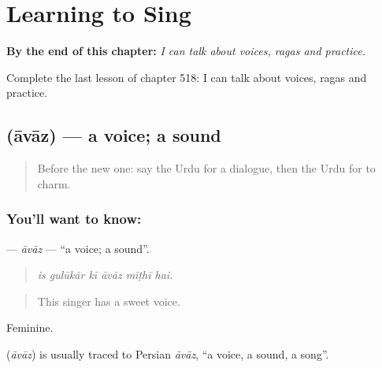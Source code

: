 
\chapter{Learning to Sing}
\label{ch:ur-learning-to-sing}

\begin{chapteropening}
\textbf{By the end of this chapter:} \emph{I can talk about voices, ragas and practice.}

Complete the last lesson of chapter 518: I can talk about voices, ragas and practice.
\end{chapteropening}

\section[\texorpdfstring{\ur{آواز} (āvāz)}{آواز (āvāz)}]{ (āvāz) — a voice; a sound}

\label{lesson:UR-C518-avaz}



\begin{quote}
Before the new one: say the Urdu for a dialogue, then the Urdu for to charm.
\end{quote}

\subsection*{You'll want to know: }
\textbf{} — \emph{āvāz} — \textquotedblleft{}a voice; a sound\textquotedblright{}.

\begin{quote}
     
\end{quote}

\begin{quote}
\emph{is gulūkār kī āvāz mīṭhī hai.}
\end{quote}

\begin{quote}
This singer has a sweet voice.
\end{quote}

Feminine.

\begin{cousinweb}
\textbf{} (\emph{āvāz}) is usually traced to Persian \emph{āvāz}, \textquotedblleft{}a voice, a sound, a song\textquotedblright{}.
\end{cousinweb}

